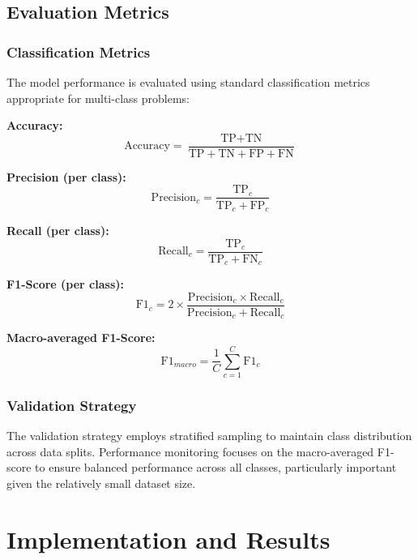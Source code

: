 \documentclass[11pt, a4paper]{article}
\begin{document}
\subsection{Evaluation Metrics}

\subsubsection{Classification Metrics}

The model performance is evaluated using standard classification metrics appropriate for multi-class problems:

\textbf{Accuracy:}
\begin{equation}
\text{Accuracy} = \frac{\text{TP} + \text{TN}}{\text{TP} + \text{TN} + \text{FP} + \text{FN}}
\end{equation}

\textbf{Precision (per class):}
\begin{equation}
\text{Precision}_c = \frac{\text{TP}_c}{\text{TP}_c + \text{FP}_c}
\end{equation}

\textbf{Recall (per class):}
\begin{equation}
\text{Recall}_c = \frac{\text{TP}_c}{\text{TP}_c + \text{FN}_c}
\end{equation}

\textbf{F1-Score (per class):}
\begin{equation}
\text{F1}_c = 2 \times \frac{\text{Precision}_c \times \text{Recall}_c}{\text{Precision}_c + \text{Recall}_c}
\end{equation}

\textbf{Macro-averaged F1-Score:}
\begin{equation}
\text{F1}_{macro} = \frac{1}{C} \sum_{c=1}^{C} \text{F1}_c
\end{equation}

\subsubsection{Validation Strategy}

The validation strategy employs stratified sampling to maintain class distribution across data splits. Performance monitoring focuses on the macro-averaged F1-score to ensure balanced performance across all classes, particularly important given the relatively small dataset size.

\section{Implementation and Results}
\end{document}
